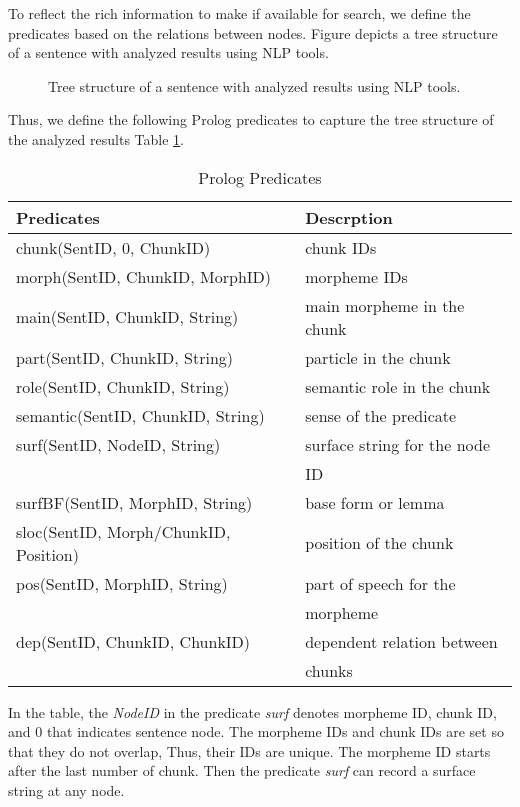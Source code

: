 \documentclass[conference]{IEEEtran}
\begin{document}
To reflect the rich information to make if available for search, we define the predicates
based on the relations between nodes. Figure \label{fig:tree} depicts a tree structure of
a sentence with analyzed results using NLP tools. 

\begin{figure}[htbp]
\caption{Tree structure of a sentence with analyzed results using NLP tools.} 
\label{fig:tree}
\end{figure}

Thus, we define the following Prolog predicates to capture the tree structure of
the analyzed results Table \ref{tbl:predicates}. 

\begin{table}[htbp]
\caption{Prolog Predicates}
\begin{center}
  \begin{tabular}{|l|l|}\hline
      Predicates &  Descrption \\\hline
      chunk(SentID, 0, ChunkID) & chunk IDs  \\
      morph(SentID, ChunkID, MorphID) & morpheme IDs \\  
      main(SentID, ChunkID, String) & main morpheme in the chunk\\
      part(SentID, ChunkID, String) & particle in the chunk \\
      role(SentID, ChunkID, String) & semantic role in the chunk \\
      semantic(SentID, ChunkID, String) & sense of the predicate \\
      surf(SentID, NodeID, String) & surface string for the node\\
                       & ID \\
      surfBF(SentID, MorphID, String) & base form or lemma \\
      sloc(SentID, Morph/ChunkID, Position) & position of the chunk\\
      pos(SentID, MorphID, String) & part of speech for the \\
                                   &  morpheme\\
      dep(SentID, ChunkID, ChunkID) & dependent relation between \\
                        & chunks\\\hline
\end{tabular}
\label{tbl:predicates}
\end{center}
\end{table}
In the table, the {\it NodeID} in the predicate {\it surf} denotes
morpheme ID, chunk ID, and 0 that indicates sentence node.
The morpheme IDs and chunk IDs are set so that they do not overlap,
Thus, their IDs are unique. The morpheme ID starts after the last number
of chunk. Then the predicate {\it surf} can
record a surface string at any node.
\end{document}

